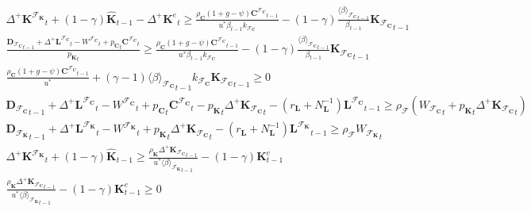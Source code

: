 \documentclass[a4paper, headings=standardclasses]{scrartcl}
\numberwithin{equation}{subsection}
\begin{document}
{\begin{gather}
		{\Delta^+\mathbf{K}^{\mathcal{F}_\mathbf{K}}}_t + (1-\gamma)\hat{\mathbf{K}}_{t-1} - {\Delta^+\mathbf{K}^e}_t \ge \frac{\rho_\mathbf{C} (1 + g - \psi) {\mathbf{C}^{\mathcal{F}_\mathbf{C}}}_{t-1}}{u^* \beta_{t-1} k_{\mathcal{F}_\mathbf{C}}} - (1 - \gamma) \frac{{\langle\beta\rangle_{\mathcal{F}_\mathbf{C}}}_{t-1}}{\beta_{t-1}} {\mathbf{K}_{\mathcal{F}_\mathbf{C}}}_{t-1} \\
		\frac{{\mathbf{D}_{\mathcal{F}_\mathbf{C}}}_{t-1} + {\Delta^+{\mathbf{L}^{\mathcal{F}_\mathbf{C}}}}_t - {W^{\mathcal{F}_\mathbf{C}}}_t + {p_{\mathbf{C}}}_t {\mathbf{C}^{\mathcal{F}_\mathbf{C}}}_t}{{p_\mathbf{K}}_t} \ge \frac{\rho_\mathbf{C} (1 + g - \psi) {\mathbf{C}^{\mathcal{F}_\mathbf{C}}}_{t-1}}{u^* \beta_{t-1} k_{\mathcal{F}_\mathbf{C}}} - (1 - \gamma) \frac{{\langle\beta\rangle_{\mathcal{F}_\mathbf{C}}}_{t-1}}{\beta_{t-1}} {\mathbf{K}_{\mathcal{F}_\mathbf{C}}}_{t-1} \\
		\frac{\rho_\mathbf{C} (1 + g - \psi) {\mathbf{C}^{\mathcal{F}_\mathbf{C}}}_{t-1}}{u^*} + (\gamma - 1) {\langle\beta\rangle_{\mathcal{F}_\mathbf{C}}}_{t-1} k_{\mathcal{F}_\mathbf{C}} {\mathbf{K}_{\mathcal{F}_\mathbf{C}}}_{t-1} \ge 0\\
		{\mathbf{D}_{\mathcal{F}_\mathbf{C}}}_{t-1} + {\Delta^+{\mathbf{L}^{\mathcal{F}_\mathbf{C}}}}_t - {W^{\mathcal{F}_\mathbf{C}}}_t + {p_{\mathbf{C}}}_t {\mathbf{C}^{\mathcal{F}_\mathbf{C}}}_t - {p_{\mathbf{K}}}_t {\Delta^+{\mathbf{K}_{\mathcal{F}_\mathbf{C}}}}_t - (r_\mathbf{L} + N_\mathbf{L}^{-1}) {\mathbf{L}^{\mathcal{F}_\mathbf{C}}}_{t-1} \ge \rho_\mathcal{F}({W_{\mathcal{F}_\mathbf{C}}}_t + {p_{\mathbf{K}}}_t {\Delta^+{\mathbf{K}_{\mathcal{F}_\mathbf{C}}}}_t ) \\
		{\mathbf{D}_{\mathcal{F}_\mathbf{K}}}_{t-1} + {\Delta^+{\mathbf{L}^{\mathcal{F}_\mathbf{K}}}}_t - {W^{\mathcal{F}_\mathbf{K}}}_t +  {p_{\mathbf{K}}}_t {\Delta^+{\mathbf{K}_{\mathcal{F}_\mathbf{C}}}}_t - (r_\mathbf{L} + N_\mathbf{L}^{-1}) {\mathbf{L}^{\mathcal{F}_\mathbf{K}}}_{t-1} \ge \rho_\mathcal{F}{W_{\mathcal{F}_\mathbf{K}}}_t \\
		{\Delta^+\mathbf{K}^{\mathcal{F}_\mathbf{K}}}_t + (1-\gamma)\hat{\mathbf{K}}_{t-1} \ge  \frac{\rho_\mathbf{K} {\Delta^+\mathbf{K}_{\mathcal{F}_\mathbf{C}}}_{t-1}}{u^* {\langle \beta \rangle_{\mathcal{F}_\mathbf{K}}}_{t-1}} - (1-\gamma) \mathbf{K}^e_{t-1} \\
		\frac{\rho_\mathbf{K} {\Delta^+\mathbf{K}_{\mathcal{F}_\mathbf{C}}}_{t-1}}{u^* {\langle \beta \rangle_{\mathcal{F}_\mathbf{K}}}_{t-1}} - (1-\gamma) \mathbf{K}^e_{t-1} \ge 0\\

\end{gather}}
\end{document}
